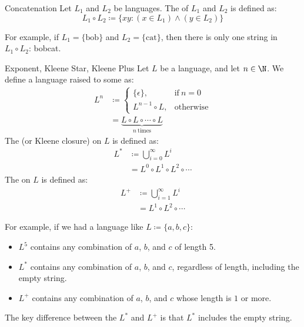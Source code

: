 \documentclass[math]{amznotes}
\begin{document}
\begin{dfnbox}{Concatenation}{}
    Let $L_1$ and $L_2$ be languages. The  of $L_1$ and $L_2$ is defined as:
    \[ L_1 \circ L_2 \coloneq \{ xy : (x \in L_1) \land (y \in L_2) \} \]
\end{dfnbox}

For example, if $L_1 = \{\text{bob}\}$ and $L_2 = \{\text{cat}\}$, then there is only one string in $L_1 \circ L_2$: bobcat.

\begin{dfnbox}{Exponent, Kleene Star, Kleene Plus}{}
    Let $L$ be a language, and let $n \in \N$. We define a language raised to some  as:
    \begin{align*}
        L^n &\coloneq \begin{cases}
            \{\epsilon\}, & \text{if}\ n = 0  \\
            L^{n-1} \circ L, & \text{otherwise}
        \end{cases} \\
        &= \underbrace{L \circ L \circ \cdots \circ L}_{n\ \text{times}}
    \end{align*}
    The  (or Kleene closure) on $L$ is defined as:
    \begin{align*}
        L^* &\coloneq \bigcup_{i = 0}^\infty L^i \\
        &= L^0 \circ L^1 \circ L^2 \circ \cdots
    \end{align*}
    The  on $L$ is defined as:
    \begin{align*}
        L^+ &\coloneq \bigcup_{i = 1}^\infty L^i \\
        &= L^1 \circ L^2 \circ \cdots
    \end{align*}
\end{dfnbox}

For example, if we had a language like $L \coloneq \{a,b,c\}$:
\begin{itemize}[noitemsep]
    \item $L^5$ contains any combination of $a$, $b$, and $c$ of length 5.
    \item $L^*$ contains any combination of $a$, $b$, and $c$, regardless of length, including the empty string.
    \item $L^+$ contains any combination of $a$, $b$, and $c$ whose length is $1$ or more.
\end{itemize}
The key difference between the $L^*$ and $L^+$ is that $L^*$ includes the empty string.
\end{document}
